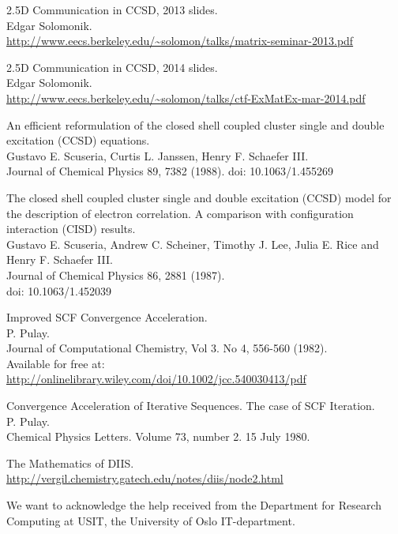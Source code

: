 \documentclass[a4paper,norsk,11pt,twoside]{report}
\begin{document}
\begin{thebibliography}{}
2.5D Communication in CCSD, 2013 slides. \\
Edgar Solomonik. \\
\url{http://www.eecs.berkeley.edu/~solomon/talks/matrix-seminar-2013.pdf} 

2.5D Communication in CCSD, 2014 slides.\\
Edgar Solomonik. \\
\url{http://www.eecs.berkeley.edu/~solomon/talks/ctf-ExMatEx-mar-2014.pdf}

An efficient reformulation of the closed shell coupled cluster single and double excitation (CCSD) equations. \\
Gustavo E. Scuseria, Curtis L. Janssen, Henry F. Schaefer III. \\
Journal of Chemical Physics 89, 7382 (1988).
doi: 10.1063/1.455269

The closed shell coupled cluster single and double excitation (CCSD) model for the description of electron correlation. A comparison with configuration interaction (CISD) results. \\
Gustavo E. Scuseria, Andrew C. Scheiner, Timothy J. Lee, Julia E. Rice and Henry F. Schaefer III. \\
Journal of Chemical Physics 86, 2881 (1987). \\
doi: 10.1063/1.452039

Improved SCF Convergence Acceleration. \\
P. Pulay. \\
Journal of Computational Chemistry, Vol 3. No 4, 556-560 (1982).\\
Available for free at: \\
\url{http://onlinelibrary.wiley.com/doi/10.1002/jcc.540030413/pdf}

Convergence Acceleration of Iterative Sequences. The case of SCF Iteration. \\
P. Pulay. \\
Chemical Physics Letters. Volume 73, number 2. 15 July 1980. 

The Mathematics of DIIS. \\
\url{http://vergil.chemistry.gatech.edu/notes/diis/node2.html}

We want to acknowledge the help received from the Department for Research Computing at USIT,
the University of Oslo IT-department.


\end{thebibliography}
\end{document}
